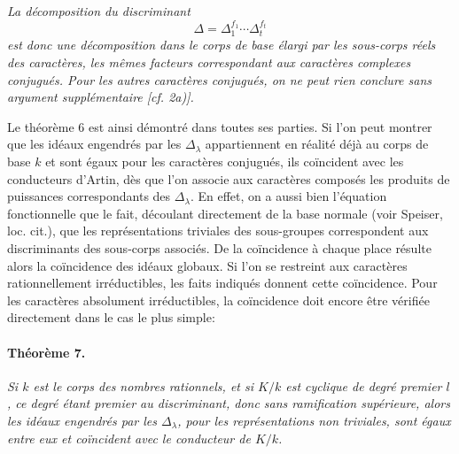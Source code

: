 \emph{La décomposition du discriminant}
\[
        \Delta=\Delta_1^{f_1}\cdots\Delta_t^{f_t}
\]
\emph{est donc une décomposition dans le corps de base élargi par les sous-corps réels des caractères, les mêmes facteurs correspondant aux caractères complexes conjugués. Pour les autres caractères conjugués, on ne peut rien conclure sans argument supplémentaire [cf. 2a)].}

Le théorème 6 est ainsi démontré dans toutes ses parties. Si l'on peut montrer que les idéaux engendrés par les \(\Delta_\lambda\) appartiennent en réalité déjà au corps de base \(k\) et sont égaux pour les caractères conjugués, ils coïncident avec les conducteurs d'Artin, dès que l'on associe aux caractères composés les produits de puissances correspondants des \(\Delta_\lambda\). En effet, on a aussi bien l'équation fonctionnelle que le fait, découlant directement de la base normale (voir Speiser, loc. cit.), que les représentations triviales des sous-groupes correspondent aux discriminants des sous-corps associés. De la coïncidence à chaque place résulte alors la coïncidence des idéaux globaux. Si l'on se restreint aux caractères rationnellement irréductibles, les faits indiqués donnent cette coïncidence. Pour les caractères absolument irréductibles, la coïncidence doit encore être vérifiée directement dans le cas le plus simple:

\paragraph{Théorème 7.}
\emph{Si \(k\) est le corps des nombres rationnels, et si \(K/k\) est cyclique de degré premier \(l\), ce degré étant premier au discriminant, donc sans ramification supérieure, alors les idéaux engendrés par les \(\Delta_\lambda\), pour les représentations non triviales, sont égaux entre eux et coïncident avec le conducteur de \(K/k\).}

